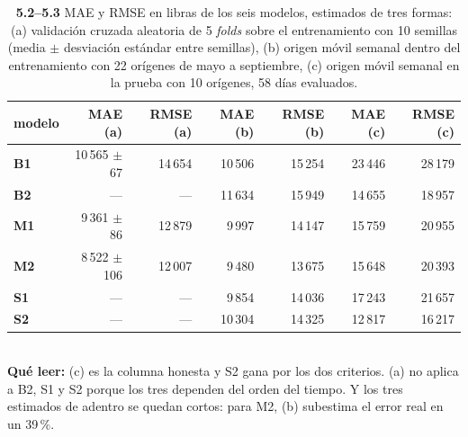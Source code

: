 \begin{table}[htbp]
\centering
\footnotesize
\caption{\textbf{5.2--5.3} MAE y RMSE en libras de los seis modelos, estimados de tres formas: (a) validaci\'on cruzada aleatoria de 5 \emph{folds} sobre el entrenamiento con 10 semillas (media $\pm$ desviaci\'on est\'andar entre semillas), (b) origen m\'ovil semanal dentro del entrenamiento con 22 or\'igenes de mayo a septiembre, (c) origen m\'ovil semanal en la prueba con 10 or\'igenes, 58 d\'ias evaluados.}
\label{tab:p5_resultados}
\begin{tabular}{lrrrrrr}
\toprule
\textbf{modelo} & \textbf{MAE (a)} & \textbf{RMSE (a)} & \textbf{MAE (b)} & \textbf{RMSE (b)} & \textbf{\textbf{MAE (c)}} & \textbf{\textbf{RMSE (c)}} \\
\midrule
\textbf{B1} & 10\,565 \tiny$\pm$67 & 14\,654 & 10\,506 & 15\,254 & 23\,446 & 28\,179 \\
\textbf{B2} & --- & --- & 11\,634 & 15\,949 & 14\,655 & 18\,957 \\
\textbf{M1} & 9\,361 \tiny$\pm$86 & 12\,879 & 9\,997 & 14\,147 & 15\,759 & 20\,955 \\
\textbf{M2} & 8\,522 \tiny$\pm$106 & 12\,007 & 9\,480 & 13\,675 & 15\,648 & 20\,393 \\
\textbf{S1} & --- & --- & 9\,854 & 14\,036 & 17\,243 & 21\,657 \\
\textbf{S2} & --- & --- & 10\,304 & 14\,325 & 12\,817 & 16\,217 \\
\bottomrule
\end{tabular}
\\[0.3em]{\scriptsize \textbf{Qu\'e leer:} (c) es la columna honesta y S2 gana por los dos criterios. (a) no aplica a B2, S1 y S2 porque los tres dependen del orden del tiempo. Y los tres estimados de adentro se quedan cortos: para M2, (b) subestima el error real en un 39\,\%.}
\end{table}
